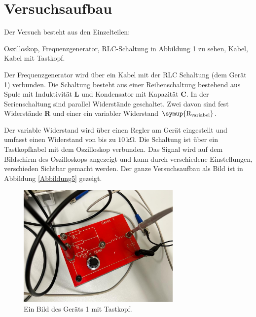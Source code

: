 \section{Versuchsaufbau}

\begin{flushleft}
    Der Versuch besteht aus den Einzelteilen: \\

    \vspace{0.3cm}

    Oszilloskop, Frequenzgenerator, RLC-Schaltung in Abbildung \ref{Abbildung4} zu sehen, Kabel, Kabel mit Tastkopf.
    
    \vspace{0.3cm}

    Der Frequenzgenerator wird über ein Kabel mit der RLC Schaltung (dem Gerät 1) verbunden.
    Die Schaltung besteht aus einer Reihenschaltung bestehend aus Spule mit Induktivität \textbf{L} und Kondensator mit Kapazität \textbf{C}. 
    In der Serienschaltung sind parallel Widerstände geschaltet. 
    Zwei davon sind fest Widerstände \textbf{R} und einer ein variabler Widerstand $\symup{\text{R}_\text{variabel}}$.

    \vspace{0.5cm}

    Der variable Widerstand wird über einen Regler am Gerät eingestellt und umfasst einen Widerstand von bis zu $10\,\unit{\kilo\ohm}$.
    Die Schaltung ist über ein Tastkopfkabel mit dem Oszilloskop verbunden. Das Signal wird auf dem Bildschirm des Oszilloskops angezeigt und kann durch verschiedene Einstellungen, verschieden Sichtbar gemacht werden.
    Der ganze Versuchsaufbau als Bild ist in Abbildung \ref{Abbildung5} gezeigt. 
\end{flushleft}

\begin{figure}[H]
    \centering
    \includegraphics[width=80mm]{bilder/Ab4.jpeg}
    \caption{Ein Bild des Geräts 1 mit Tastkopf.\label{Abbildung4}}
\end{figure}

